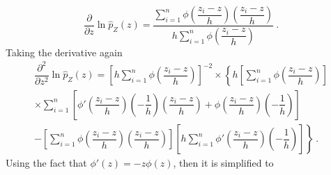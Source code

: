 \begin{equation}
  \dfrac{
    \partial
  }
  {
    \partial z
  }
  \ln\widehat{p}_Z(z)
  =
  \dfrac{
    \sum_{i=1}^n
    \phi\left(
      \dfrac{
        z_i - z
      }
      {
        h
      }
    \right)
    \left(
      \dfrac{
        z_i - z
      }
      {
        h
      }
    \right)
  }
  {
    h
    \sum_{i=1}^n
    \phi\left(
      \dfrac{
        z_i - z
      }
      {
        h
      }
    \right)
  }
  \ .
\end{equation}
Taking the derivative again
\begin{multline*}
  \dfrac{
    \partial^2
  }
  {
    \partial z^2
  }
  \ln\widehat{p}_Z(z)
  =
  \left[
    h\sum_{i=1}^n
    \phi\left(
      \dfrac{
        z_i-z
      }
      {
        h
      }
    \right)
  \right]^{-2}
  \times
  \left\{
    h\left[
      \sum_{i=1}^n
      \phi\left(
        \dfrac{
          z_i-z
        }
        {
          h
        }
      \right)
    \right]
  \right.
  \\
  \left.
    \times
    \sum_{i=1}^n\left[
      \phi'\left(
        \dfrac{
          z_i-z
        }
        {
          h
        }
      \right)
      \left(
        -\dfrac{
          1
        }
        {
          h
        }
      \right)
      \left(
        \dfrac{
          z_i-z
        }
        {
          h
        }
      \right)
      +\phi\left(
        \dfrac{
          z_i-z
        }
        {
          h
        }
      \right)
      \left(
        -\dfrac{
          1
        }
        {
          h
        }
      \right)
    \right]
  \right.
  \\
  \left.
    -
    \left[
      \sum_{i=1}^n
      \phi\left(
        \dfrac{
          z_i-z
        }
        {
          h
        }
      \right)
      \left(
        \dfrac{
          z_i-z
        }
        {
          h
        }
      \right)
    \right]
    \left[
      h\sum_{i=1}^n
      \phi'\left(
        \dfrac{
          z_i-z
        }
        {
          h
        }
      \right)
      \left(
        -\dfrac{
          1
        }
        {
          h
        }
      \right)
    \right]
  \right\}
  \ .
\end{multline*}
Using the fact that $\phi'(z)=-z\phi(z)$, then it is simplified to
